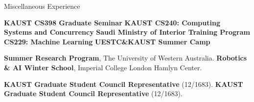 \begin{rubric}{Miscellaneous Experience}

\entry*[2025 Spring] \textbf{KAUST CS398 Graduate Seminar}
 \textbf{KAUST CS240: Computing Systems and Concurrency}
\entry*[2023 Spring] \textbf{Saudi Ministry of Interior Training Program CS229: Machine Learning}
 \textbf{UESTC\&KAUST Summer Camp}


\entry*[2019 Summer] \textbf{Summer Research Program}, The University of Western Australia.
%
\entry*[2019 Winter] \textbf{Robotics \& AI Winter School}, Imperial College London Hamlyn Center.

\entry*[2024-2025] \textbf{KAUST Graduate Student Council Representative} (12/1683).
\entry*[2023-2024] \textbf{KAUST Graduate Student Council Representative} (12/1683).

\end{rubric}